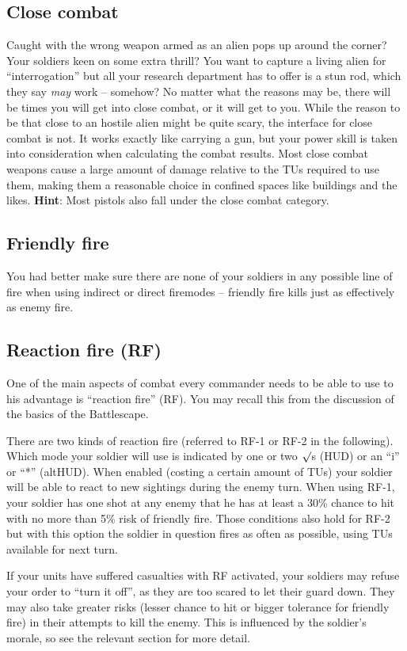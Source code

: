 \subsection{Close combat}
Caught with the wrong weapon armed as an alien pops up around the corner?
Your soldiers keen on some extra thrill? You want to capture a living alien for ``interrogation'' but all your research department has to offer is a stun rod, which they say \emph{may} work -- somehow? No matter what the reasons may be, there will be times you will get into close combat, or it will get to you. While the reason to be that close to an hostile alien might be quite scary, the interface for close combat is not. It works exactly like carrying a gun, but your power skill is taken into consideration when calculating the combat results. Most close combat weapons cause a large amount of damage relative to the TUs required to use them, making them a reasonable choice in confined spaces like buildings and the likes. \textbf{Hint}: Most pistols also fall under the close combat category.

\subsection{Friendly fire}
You had better make sure there are none of your soldiers in any possible line of fire when using indirect or direct firemodes -- friendly fire kills just as effectively as enemy fire.

\subsection{Reaction fire (RF)}
One of the main aspects of combat every commander needs to be able to use to his advantage is ``reaction fire'' (RF). You may recall this from the discussion of the basics of the Battlescape.

There are two kinds of reaction fire (referred to RF-1 or RF-2 in the following). Which mode your soldier will use is indicated by one or two $\surd$s (HUD) or an ``i'' or ``*'' (altHUD). When enabled (costing a certain amount of TUs) your soldier will be able to react to new sightings during the enemy turn. When using RF-1, your soldier has one shot at any enemy that he has at least a 30\% chance to hit with no more than 5\% risk of friendly fire. Those conditions also hold for RF-2 but with this option the soldier in question fires as often as possible, using TUs available for next turn.

If your units have suffered casualties with RF activated, your soldiers may refuse your order to ``turn it off'', as they are too scared to let their guard down.  They may also take greater risks (lesser chance to hit or bigger tolerance for friendly fire) in their attempts to kill the enemy.  This is influenced by the soldier's morale, so see the relevant section for more detail.

